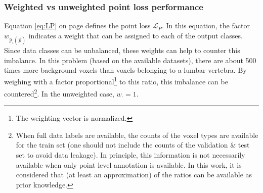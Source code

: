 \subsubsection{Weighted vs unweighted point loss performance}
\par{
    Equation \ref{eq:LP} on page \pageref{eq:LP} defines the point loss $\mathcal{L}_P$. 
    In this equation, the factor $w_{\mathcal{Y}_i(\vec{p})}$ indicates a weight that can be assigned to each of the output classes.
    Since data classes can be unbalanced, these weights can help to counter this imbalance.
    In this problem (based on the available datasets), there are about 500 times more background voxels than voxels belonging to a lumbar vertebra.
    By weighing with a factor proportional\footnote{The weighting vector is normalized.} to this ratio, this imbalance can be countered\footnote{
        When full data labels are available, the counts of the voxel types are available for the train set (one should not include the counts of the validation \& test set to avoid data leakage).
        In principle, this information is not necessarily available when only point level annotation is available. In this work, it is considered that (at least an approximation) of the ratios can be available as prior knowledge.
    }. In the unweighted case, $w_{\cdot} = 1$.
}



